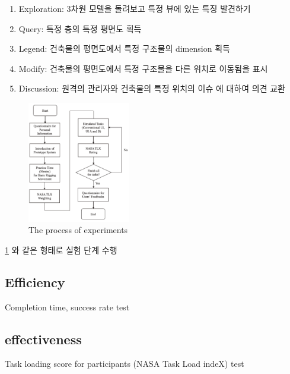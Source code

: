 \begin{enumerate}
\item Exploration: 3차원 모델을 돌려보고 특정 뷰에 있는 특징 발견하기
\item Query: 특정 층의 특정 평면도 획득
\item Legend: 건축물의 평면도에서 특정 구조물의 dimension 획득
\item Modify: 건축물의 평면도에서 특정 구조물을 다른 위치로 이동됨을 표시
\item Discussion: 원격의 관리자와 건축물의 특정 위치의 이슈 에 대하여 의견 교환
\end{enumerate}

\begin{figure}[ht!]
	\centering
    \includegraphics[width=0.4\textwidth]{5-Experiments/process}
	\caption{The process of experiments}
    \label{fig:exp_process}
\end{figure}

\ref{fig:exp_process} 와 같은 형태로 실험 단계 수행

\subsection{Efficiency}

Completion time, success rate test

\subsection{effectiveness}
Task loading score for participants (NASA Task Load indeX) test

